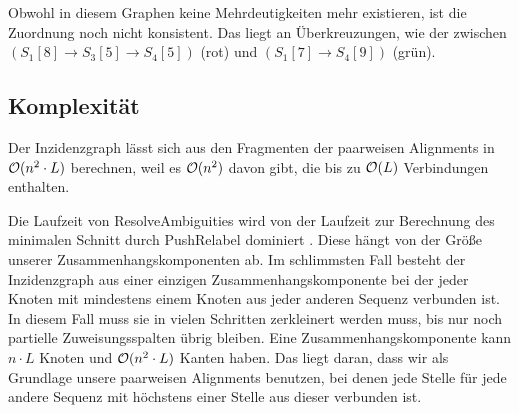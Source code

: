 \begin{center}
\end{center}

Obwohl in diesem Graphen keine Mehrdeutigkeiten mehr existieren, ist die Zuordnung noch nicht konsistent. Das liegt an Überkreuzungen, wie der zwischen $(S_1[8] \rightarrow S_3[5] \rightarrow S_4[5])$ (rot) und $(S_1[7] \rightarrow S_4[9])$ (grün). 

\subsection{Komplexität}\label{ch:ra_kompl}

Der Inzidenzgraph lässt sich aus den Fragmenten der paarweisen Alignments in $\mathcal{O}(n^2\cdot L)$ berechnen, weil es $\mathcal{O}(n^2)$ davon gibt, die bis zu $\mathcal{O}(L)$ Verbindungen enthalten.

Die Laufzeit von \textrm{ResolveAmbiguities} wird von der Laufzeit zur Berechnung des minimalen Schnitt durch \textrm{PushRelabel} dominiert \cite{cpm10}. Diese hängt von der Größe unserer Zusammenhangskomponenten ab. Im schlimmsten Fall besteht der Inzidenzgraph aus einer einzigen Zusammenhangskomponente bei der jeder Knoten mit mindestens einem Knoten aus jeder anderen Sequenz verbunden ist. In diesem Fall muss sie in vielen Schritten zerkleinert werden muss, bis nur noch partielle Zuweisungsspalten übrig bleiben. Eine Zusammenhangskomponente kann $n\cdot L$ Knoten und $\mathcal{O}(n^2\cdot L)$ Kanten haben. Das liegt daran, dass wir als Grundlage unsere paarweisen Alignments benutzen, bei denen jede Stelle für jede andere Sequenz mit höchstens einer Stelle aus dieser verbunden ist. 

